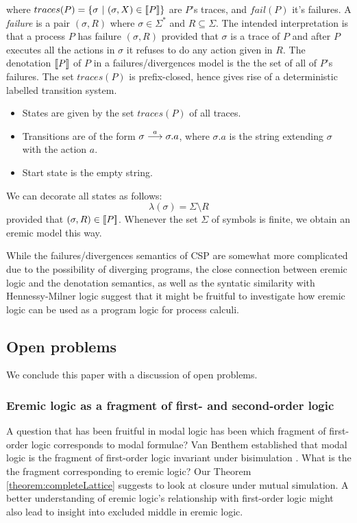 where $traces(P) = \{ \sigma\ |\ (\sigma, X) \in \lbrack\!\lbrack P \rbrack\!\rbrack \}$ are
$P$'s traces, and $fail(P)$ it's failures.  A \emph{failure} is a pair
$(\sigma, R)$ where $\sigma \in \Sigma^*$ and $R \subseteq
\Sigma$. The intended interpretation is that a process $P$ has failure
$(\sigma, R)$ provided that $\sigma$ is a trace of $P$ and after $P$
executes all the actions in $\sigma$ it refuses to do any action given
in $R$. The denotation $\lbrack\!\lbrack P \rbrack\!\rbrack$ of $P$ in a failures/divergences
model is the the set of all of $P$'s failures. The set $ traces(P)$ is
prefix-closed, hence gives rise of a deterministic labelled transition
system.
\begin{itemize}

\item States are given by the set $traces(P)$ of all traces.

\item Transitions are of the form $\sigma \stackrel{a}{\longrightarrow} \sigma.a$, where
  $\sigma.a$ is the string extending $\sigma$ with the action $a$.

\item Start state is the empty string.

\end{itemize}
We can decorate all states as follows:
\[
   \lambda (\sigma) = \Sigma \setminus R
\]
provided that $(\sigma, R) \in \lbrack\!\lbrack P \rbrack\!\rbrack$.  Whenever the set $\Sigma$
of symbols is finite, we obtain an eremic model this way.

While the failures/divergences semantics of CSP are somewhat more
complicated due to the possibility of diverging programs, the close
connection between eremic logic and the denotation semantics, as well
as the syntatic similarity with Hennessy-Milner logic suggest that it
might be fruitful to investigate how eremic logic can be used as a
program logic for process calculi.

\subsection{Open problems} 

We conclude this paper with a discussion of open problems.

\subsubsection{Eremic logic as a fragment of first- and second-order logic }

A question that has been fruitful in modal logic has been which
fragment of first-order logic corresponds to modal formulae?  Van
Benthem established that modal logic is the fragment of first-order
logic invariant under bisimulation \cite{BlackburnP:modlog}. What is
the the fragment corresponding to eremic logic? Our Theorem
\ref{theorem:completeLattice} suggests to look at closure under mutual
simulation.  A better understanding of eremic logic's relationship
with first-order logic might also lead to insight into excluded middle
in eremic logic.

